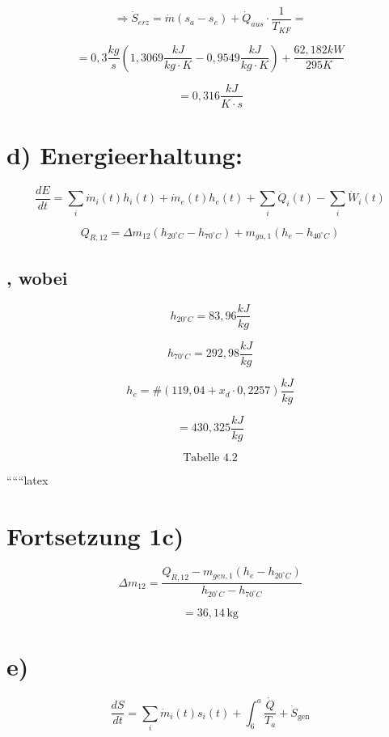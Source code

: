 \[
\Rightarrow \dot{S}_{erz} = \dot{m}(s_a - s_e) + \dot{Q}_{aus} \cdot \frac{1}{T_{KF}} = 
\]

\[
= 0{,}3 \frac{kg}{s} \left( 1{,}3069 \frac{kJ}{kg \cdot K} - 0{,}9549 \frac{kJ}{kg \cdot K} \right) + \frac{62{,}182 kW}{295 K}
\]

\[
= 0{,}316 \frac{kJ}{K \cdot s}
\]

\section*{d) Energieerhaltung:}

\[
\frac{dE}{dt} = \sum_i \dot{m}_i(t) h_i(t) + \dot{m}_e(t) h_e(t) + \sum_i \dot{Q}_i(t) - \sum_i \dot{W}_i(t)
\]

\[
Q_{R,12} = \Delta m_{12} (h_{20^\circ C} - h_{70^\circ C}) + m_{gu,1} (h_e - h_{40^\circ C})
\]

\subsection*{, wobei}

\[
h_{20^\circ C} = 83{,}96 \frac{kJ}{kg}
\]

\[
h_{70^\circ C} = 292{,}98 \frac{kJ}{kg}
\]

\[
h_e = \# (119{,}04 + x_d \cdot 0{,}2257) \frac{kJ}{kg}
\]

\[
= 430{,}325 \frac{kJ}{kg}
\]

\[
\text{Tabelle 4.2}
\]

``````latex


\section*{Fortsetzung 1c)}

\begin{equation*}
\Delta m_{12} = \frac{Q_{R,12} - m_{gen,1} (h_{e} - h_{20^{\circ}C})}{h_{20^{\circ}C} - h_{70^{\circ}C}}
\end{equation*}

\begin{equation*}
= 36,14 \, \text{kg}
\end{equation*}

\section*{e)}

\begin{equation*}
\frac{dS}{dt} = \sum_{i} \dot{m}_{i}(t) s_{i}(t) + \int_{6}^{a} \frac{\dot{Q}}{T_{a}} + \dot{S}_{\text{gen}}
\end{equation*}

